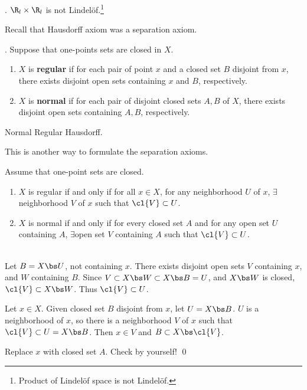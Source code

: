 \ex. \(\R_l \times \R_l\) is not Lindelöf.\footnote{Product of Lindelöf space is not Lindelöf.}

\pagebreak


Recall that Hausdorff axiom was a separation axiom.

. Suppose that one-points sets are closed in \(X\).
\begin{enumerate}
    \item {} \(X\) is \textbf{regular} if for each pair of point \(x\) and a closed set \(B\) disjoint from \(x\), there exists disjoint open sets containing \(x\) and \(B\), respectively.
    \item {} \(X\) is \textbf{normal} if for each pair of disjoint closed sets \(A, B\) of \(X\), there exists disjoint open sets containing \(A, B\), respectively.
\end{enumerate}

\rmk Normal \mimp Regular \mimp Hausdorff.

This is another way to formulate the separation axioms.

 Assume that one-point sets are closed.
\begin{enumerate}
    \item \(X\) is regular if and only if for all \(x \in X\), for any neighborhood \(U\) of \(x\), \(\exists\)neighborhood \(V\) of \(x\) such that \(\cl{V} \subset U\).
    \item \(X\) is normal if and only if for every closed set \(A\) and for any open set \(U\) containing \(A\), \(\exists\)open set \(V\) containing \(A\) such that \(\cl{V} \subset U\).
\end{enumerate}

\pf \\
 \note{\mimp} Let \(B = X \bs U\), not containing \(x\). There exists disjoint open sets \(V\) containing \(x\), and \(W\) containing \(B\). Since \(V \subset X \bs W \subset X \bs B = U\), and \(X \bs W\) is closed, \(\cl{V} \subset X \bs W\). Thus \(\cl{V} \subset U\).

\note{\mimpd} Let \(x \in X\). Given closed set \(B\) disjoint from \(x\), let \(U = X \bs B\). \(U\) is a neighborhood of \(x\), so there is a neighborhood \(V\) of \(x\) such that \(\cl{V} \subset U = X \bs B\). Then \(x \in V\) and \(B \subset X \bs \cl{V}\).

 Replace \(x\) with closed set \(A\). Check by yourself! \qed

